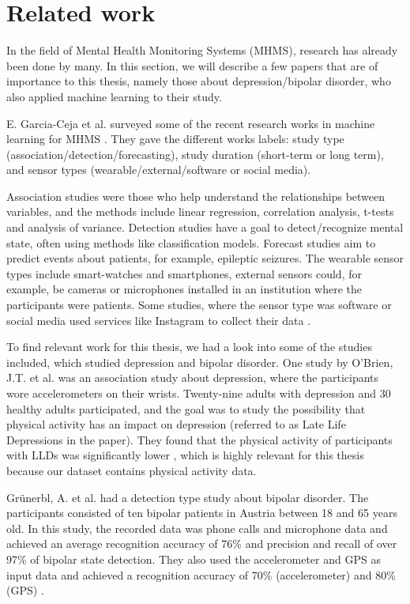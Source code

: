 \section{Related work}

In the field of Mental Health Monitoring Systems (MHMS), research has already been done by many. In this section, we will describe a few papers that are of importance to this thesis, namely those about depression/bipolar disorder, who also applied machine learning to their study. 

E. Garcia-Ceja et al. surveyed some of the recent research works in machine learning for MHMS \cite{GarciaCeja2018_survey}. They gave the different works labels: study type (association/detection/forecasting), study duration (short-term or long term), and sensor types (wearable/external/software or social media). 

Association studies were those who help understand the relationships between variables, and the methods include linear regression, correlation analysis, t-tests and analysis of variance. Detection studies have a goal to detect/recognize mental state, often using methods like classification models. Forecast studies aim to predict events about patients, for example, epileptic seizures. The wearable sensor types include smart-watches and smartphones, external sensors could, for example, be cameras or microphones installed in an institution where the participants were patients. Some studies, where the sensor type was software or social media used services like Instagram to collect their data \cite{GarciaCeja2018_survey}. 

To find relevant work for this thesis, we had a look into some of the studies included, which studied depression and bipolar disorder. One study by O'Brien, J.T. et al. was an association study about depression, where the participants wore accelerometers on their wrists. Twenty-nine adults with depression and 30 healthy adults participated, and the goal was to study the possibility that physical activity has an impact on depression (referred to as Late Life Depressions in the paper). They found that the physical activity of participants with LLDs was significantly lower \cite{obrien_depression}, which is highly relevant for this thesis because our dataset contains physical activity data. 

Grünerbl, A. et al. had a detection type study about bipolar disorder. The participants consisted of ten bipolar patients in Austria between 18 and 65 years old. In this study, the recorded data was phone calls and microphone data and achieved an average recognition accuracy of 76\% and precision and recall of over 97\% of bipolar state detection. They also used the accelerometer and GPS as input data and achieved a recognition accuracy of 70\% (accelerometer) and 80\% (GPS) \cite{grunerbl_smartphone_bipolar}.

